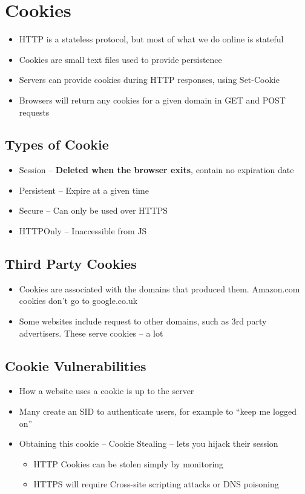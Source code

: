 \documentclass{article}
\begin{document}
\tableofcontents

\newpage

\section{Cookies}
\begin{itemize}
	\item HTTP is a stateless protocol, but most of what we do online is stateful 
	\item Cookies are small text files used to provide persistence
	\item Servers can provide cookies during HTTP responses, using Set-Cookie 
	\item Browsers will return any cookies for a given domain in GET and POST requests
\end{itemize}

\subsection{Types of Cookie}
\begin{itemize}
	\item Session – \textbf{Deleted when the browser exits}, contain no expiration date 
	\item Persistent – Expire at a given time 
	\item Secure – Can only be used over HTTPS 
	\item HTTPOnly – Inaccessible from JS
\end{itemize}

\subsection{Third Party Cookies}
\begin{itemize}
	\item Cookies are associated with the domains that produced them. Amazon.com cookies don’t go to google.co.uk 
	\item Some websites include request to other domains, such as 3rd party advertisers. These serve cookies – a lot
\end{itemize}

\subsection{Cookie Vulnerabilities}
\begin{itemize}
	\item How a website uses a cookie is up to the server 
	\item Many create an SID to authenticate users, for example to “keep me logged on” 
	\item Obtaining this cookie – Cookie Stealing – lets you hijack their session 
	\begin{itemize}
		\item HTTP Cookies can be stolen simply by monitoring 
		\item HTTPS will require Cross-site scripting attacks or DNS poisoning
	\end{itemize}
\end{itemize}
\end{document}
